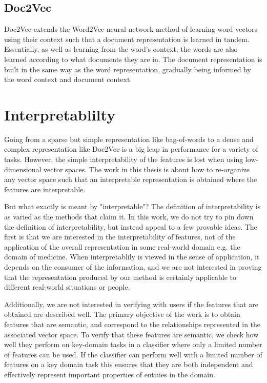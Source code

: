 \subsection{Doc2Vec}\label{ch2:doc2vec}

Doc2Vec \cite{Le2014a} extends the Word2Vec neural network method of learning word-vectors using their context such that a document representation is learned in tandem. Essentially, as well as learning from the word's context, the words are also learned according to  what documents they are in. The document representation is built in the same way as the word representation, gradually being informed by the word context and document context.

\section{Interpretablilty}

Going from a sparse but simple representation like bag-of-words to a dense and complex representation like Doc2Vec is a big leap in performance for a variety of tasks. However, the simple interpretability of the features is lost when using low-dimensional vector spaces. The work in this thesis is about how to re-organize any vector space such that an interpretable representation is obtained where the features are interpretable.

But what exactly is meant by "interpretable"? The definition of interpretability is as varied as the methods  that claim it. In this work, we do not try to pin down the definition of interpretability, but instead appeal to a few provable ideas. The first is that we are interested in the interpretability of features, not of the application of the overall representation in some real-world domain e.g. the domain of medicine. When interpretablily is viewed in the sense of application, it depends on the consumer of the information, and we are not interested in proving that the representation produced by our method is certainly applicable to different real-world situations or people.

Additionally, we are not interested in verifying with users if the features that are obtained are  described well. The primary objective of the work is to obtain features that are semantic, and correspond to the relationships represented in the associated vector space. To verify that these features are semantic, we check how well they perform on key-domain tasks in a classifier where only a limited number of features can be used. If the classifier can perform well with a limited number of features on a key domain task this ensures that they are both independent and effectively represent important properties of entities in the domain.

